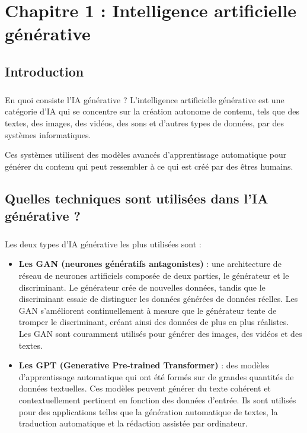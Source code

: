 \chapter{Chapitre 1 : Intelligence artificielle générative}
\section*{Introduction}
\paragraph{}
En quoi consiste l’IA générative ? L'intelligence artificielle générative est
une catégorie d'IA qui se concentre sur la création autonome de contenu, tels que
des textes, des images, des vidéos, des sons et d'autres types de données, par des
systèmes informatiques.

Ces systèmes utilisent des modèles avancés d'apprentissage automatique pour générer
du contenu qui peut ressembler à ce qui est créé par des êtres humains.
\section{Quelles techniques sont utilisées dans l’IA générative ?}
\paragraph{}
Les deux types d'IA générative les plus utilisées sont :

\begin{itemize}
	\item \textbf{Les GAN (neurones génératifs antagonistes)} : une architecture
		de réseau de neurones artificiels composée de deux parties, le générateur et
		le discriminant. Le générateur crée de nouvelles données, tandis que le discriminant
		essaie de distinguer les données générées de données réelles. Les GAN s'améliorent
		continuellement à mesure que le générateur tente de tromper le discriminant,
		créant ainsi des données de plus en plus réalistes. Les GAN sont couramment
		utilisés pour générer des images, des vidéos et des textes.

	\item \textbf{Les GPT (Generative Pre-trained Transformer)} : des modèles d'apprentissage
		automatique qui ont été formés sur de grandes quantités de données
		textuelles. Ces modèles peuvent générer du texte cohérent et contextuellement
		pertinent en fonction des données d'entrée. Ils sont utilisés pour des
		applications telles que la génération automatique de textes, la traduction automatique
		et la rédaction assistée par ordinateur.
\end{itemize}
